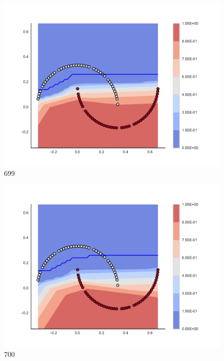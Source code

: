 \begin{subfigure}[b]{0.09\textwidth}
    \includegraphics[clip, trim=2.35cm 1.75cm 4.5cm 0cm,width=\textwidth]{img/convergence/699.pdf}
    \caption{699}
    \label{fig:convergence_699}
\end{subfigure}
%
\begin{subfigure}[b]{0.09\textwidth}
    \includegraphics[clip, trim=2.35cm 1.75cm 4.5cm 0cm,width=\textwidth]{img/convergence/700.pdf}
    \caption{700}
    \label{fig:convergence_700}
\end{subfigure}
%
